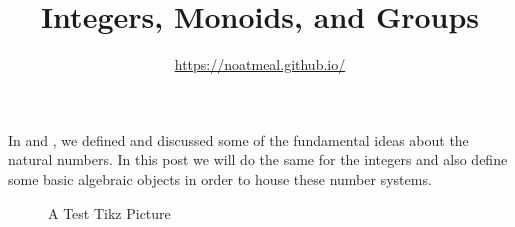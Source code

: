 \documentclass{article}
\title{Integers, Monoids, and Groups}
\author{\url{https://noatmeal.github.io/}}
\date{}
\theoremstyle{definition}
\theoremstyle{definition}
\theoremstyle{plain}
\theoremstyle{remark}
\theoremstyle{plain}
\theoremstyle{remark}
\theoremstyle{plain}
\theoremstyle{plain}
\theoremstyle{plain}
\theoremstyle{plain}
\begin{document}
\maketitle

In \cite{recursion_theorem} and \cite{dist_assoc_comm}, we defined and discussed
some of the fundamental ideas about the natural numbers. In this post we will 
do the same for the integers and also define some basic algebraic objects in 
order to house these number systems.

\begin{figure}[h]
  \begin{center}
  \end{center}
  \caption{A Test Tikz Picture}
\end{figure}



\end{document}
